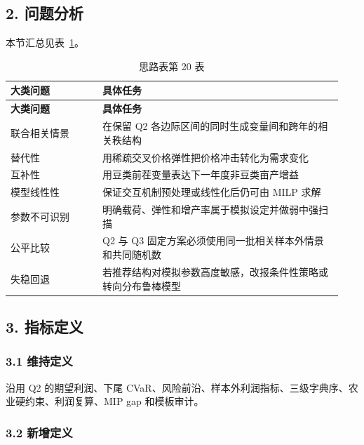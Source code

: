\documentclass[UTF8,11pt,a4paper]{ctexart}
\begin{document}
\subsection{2. 问题分析}

\noindent 本节汇总见表~\ref{tab:thought-20}。
\begin{longtable}{@{}>{\raggedright\arraybackslash}p{0.26\linewidth}>{\raggedright\arraybackslash}p{0.68\linewidth}@{}}
\caption{思路表第 20 表}\label{tab:thought-20}\\
\toprule
\textbf{大类问题} & \textbf{具体任务} \\
\midrule
\endfirsthead
\toprule
\textbf{大类问题} & \textbf{具体任务} \\
\midrule
\endhead
联合相关情景 & 在保留 Q2 各边际区间的同时生成变量间和跨年的相关秩结构 \\
替代性 & 用稀疏交叉价格弹性把价格冲击转化为需求变化 \\
互补性 & 用豆类前茬变量表达下一年度非豆类亩产增益 \\
模型线性性 & 保证交互机制预处理或线性化后仍可由 MILP 求解 \\
参数不可识别 & 明确载荷、弹性和增产率属于模拟设定并做弱中强扫描 \\
公平比较 & Q2 与 Q3 固定方案必须使用同一批相关样本外情景和共同随机数 \\
失稳回退 & 若推荐结构对模拟参数高度敏感，改报条件性策略或转向分布鲁棒模型 \\
\bottomrule
\end{longtable}

\subsection{3. 指标定义}

\subsubsection{3.1 维持定义}

沿用 Q2 的期望利润、下尾 CVaR、风险前沿、样本外利润指标、三级字典序、农业硬约束、利润复算、MIP gap 和模板审计。

\subsubsection{3.2 新增定义}
\end{document}
